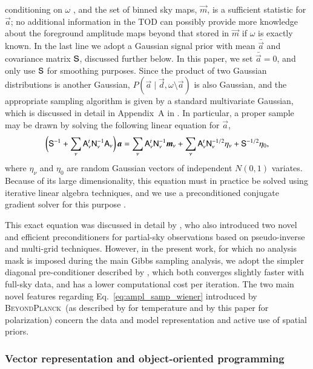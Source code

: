 \documentclass[twocolumn]{aa}
\renewcommand{\d}[0]{\vec{d}}
\newcommand{\A}[0]{\tens{A}}
\renewcommand{\a}[0]{\vec{a}}
\newcommand{\m}[0]{\vec{m}}
\newcommand{\N}[0]{\tens{N}}
\renewcommand{\S}[0]{\tens{S}}
\newcommand{\BP}{\textsc{BeyondPlanck}}
\newcommand{\?}[1]{\textcolor{red}{{\bf [#1]}}}
\begin{document}
conditioning on $\omega$ \citep{bp01}, and the set of binned sky maps, $\m$, is
a sufficient statistic for $\a$; no additional information in the TOD can possibly
provide more knowledge about the foreground amplitude maps beyond that stored in
$\m$ if $\omega$ is exactly known. In the last line we adopt a Gaussian signal prior with mean $\bar{\a}$ and
covariance matrix $\S$, discussed further below. In this paper, we set
$\bar{\a}=0$, and only use $\S$ for smoothing purposes. Since the product of two
Gaussian distributions is another Gaussian, $P(\a\mid\d, \omega\setminus\a)$ is
also Gaussian, and the appropriate sampling algorithm is given by a standard
multivariate Gaussian, which is discussed in detail in Appendix~A in
\citet{bp01}. In particular, a proper sample may be drawn by solving the
following linear equation for $\a$,
\begin{equation}
  \biggl(\S^{-1} + \sum_{\nu}\A^t_{\nu}\N_{\nu}^{-1}\A_{\nu}\biggr)\,\a = 
  \sum_\nu\A_{\nu}^t\N_\nu^{-1}\m_{\nu} + \sum_{\nu}\A_{\nu}^t\N_{\nu}^{-1/2}\eta_{\nu} +
  \S^{-1/2}\eta_{0},
\label{eq:ampl_samp_wiener}
\end{equation}
where $\eta_\nu$ and $\eta_0$ are random Gaussian vectors of independent $N(0,
1)$ variates. Because of its large dimensionality, this equation must in
practice be solved using iterative linear algebra techniques, and we use a
preconditioned conjugate gradient solver for this purpose \citep[e.g.,][]{shewchuk:1994}.

This exact equation was discussed in detail by \citet{seljebotn:2019},
who also introduced two novel and efficient preconditioners for
partial-sky observations based on pseudo-inverse and multi-grid
techniques. However, in the present work, for which no analysis mask
is imposed during the main Gibbs sampling analysis, we adopt the
simpler diagonal pre-conditioner described by \citet{eriksen2008},
which both converges slightly faster with full-sky data, and has a
lower computational cost per iteration. The two main novel features
regarding Eq.~\eqref{eq:ampl_samp_wiener} introduced by \BP\ (as
described by \citet{bp13} for temperature and by this paper for
polarization) concern the data and model representation and active use
of spatial priors.

\subsubsection{Vector representation and object-oriented programming}
\end{document}
